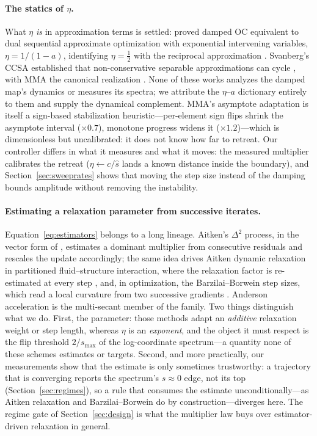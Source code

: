 \documentclass[11pt,a4paper]{article}
\newcommand{\smax}{s_{\max}}
\newcommand{\sh}{\hat{s}}
\begin{document}
\paragraph{The statics of $\eta$.} What $\eta$ \emph{is} in
approximation terms is settled: \citet{groenwold2008} proved damped OC
equivalent to dual sequential approximate optimization with exponential
intervening variables, $\eta=1/(1-a)$, identifying $\eta=\tfrac12$ with
the reciprocal approximation \citep[see
also][]{groenwold2007ise,groenwold2009gss}. Svanberg's CCSA established
that non-conservative separable approximations can cycle
\citep{svanberg2002ccsa}, with MMA the canonical realization
\citep{svanberg1987mma}. None of these works analyzes the damped map's
dynamics or measures its spectra; we attribute the $\eta$--$a$
dictionary entirely to them and supply the dynamical complement.
MMA's asymptote adaptation is itself a sign-based stabilization
heuristic---per-element sign flips shrink the asymptote interval
($\times0.7$), monotone progress widens it ($\times1.2$)---which is
dimensionless but uncalibrated: it does not know how far to retreat.
Our controller differs in what it measures and what it moves: the
measured multiplier calibrates the retreat ($\eta\leftarrow c/\sh$
lands a known distance inside the boundary), and
Section~\ref{sec:sweeprates} shows that moving the step size instead of
the damping bounds amplitude without removing the instability.

\paragraph{Estimating a relaxation parameter from successive iterates.}
Equation~\eqref{eq:estimators} belongs to a long lineage. Aitken's
$\Delta^2$ process, in the vector form of \citet{irons1969}, estimates
a dominant multiplier from consecutive residuals and rescales the
update accordingly; the same idea drives Aitken dynamic relaxation in
partitioned fluid--structure interaction, where the relaxation factor
is re-estimated at every step \citep{kuettler2008}, and, in
optimization, the Barzilai--Borwein step sizes, which read a local
curvature from two successive gradients \citep{barzilai1988}. Anderson
acceleration \citep{li2020fixedpoint} is the multi-secant member of the
family. Two things distinguish what we do. First, the parameter: those
methods adapt an \emph{additive} relaxation weight or step length,
whereas $\eta$ is an \emph{exponent}, and the object it must respect is
the flip threshold $2/\smax$ of the log-coordinate spectrum---a
quantity none of these schemes estimates or targets. Second, and more
practically, our measurements show that the estimate is only sometimes
trustworthy: a trajectory that is converging reports the spectrum's
$s\approx0$ edge, not its top (Section~\ref{sec:regimes}), so a rule
that consumes the estimate unconditionally---as Aitken relaxation and
Barzilai--Borwein do by construction---diverges here. The regime gate
of Section~\ref{sec:design} is what the multiplier law buys over
estimator-driven relaxation in general.
\end{document}

